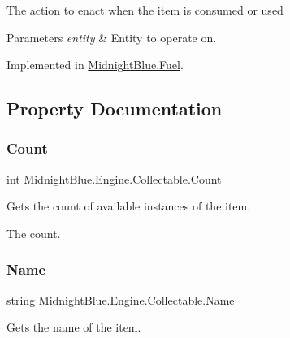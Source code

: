 The action to enact when the item is consumed or used 


\begin{DoxyParams}{Parameters}
{\em entity} & Entity to operate on.\\
\hline
\end{DoxyParams}


Implemented in \hyperlink{class_midnight_blue_1_1_fuel_a9ab52c79211ec8cdcc9389f772615ac0}{Midnight\+Blue.\+Fuel}.



\subsection{Property Documentation}
\hypertarget{class_midnight_blue_1_1_engine_1_1_collectable_a61bb027d19c487afab716c9a0e73e6a0}{}\label{class_midnight_blue_1_1_engine_1_1_collectable_a61bb027d19c487afab716c9a0e73e6a0} 
\subsubsection{\texorpdfstring{Count}{Count}}
{\footnotesize\ttfamily int Midnight\+Blue.\+Engine.\+Collectable.\+Count\hspace{0.3cm}{\ttfamily [get]}}



Gets the count of available instances of the item. 

The count.\hypertarget{class_midnight_blue_1_1_engine_1_1_collectable_ac98670a6322f2dc0ecf173d1a5cced39}{}\label{class_midnight_blue_1_1_engine_1_1_collectable_ac98670a6322f2dc0ecf173d1a5cced39} 
\subsubsection{\texorpdfstring{Name}{Name}}
{\footnotesize\ttfamily string Midnight\+Blue.\+Engine.\+Collectable.\+Name\hspace{0.3cm}{\ttfamily [get]}}



Gets the name of the item. 

